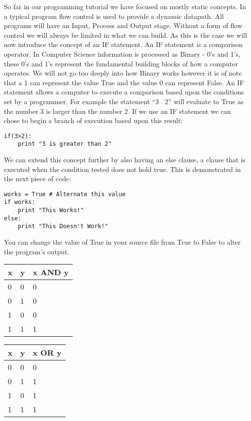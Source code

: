 \documentclass[twocolumn]{article}
\begin{document}
So far in our programming tutorial we have focused on mostly static concepts. In a typical program flow control is used to provide a dynamic datapath. All programs will have an Input, Process and Output stage. Without a form of flow control we will always be limited in what we can build. As this is the case we will now introduce the concept of an IF statement. An IF statement is a comparison operator. In Computer Science information is processed as Binary - 0's and 1's, these 0's and 1's represent the fundamental building blocks of how a computer operates. We will not go too deeply into how Binary works however it is of note that a 1 can represent the value True and the value 0 can represent False. An IF statement allows a computer to execute a comparison based upon the conditions set by a programmer. For example the statement ``3 $\>$ 2'' will evaluate to True as the number 3 is larger than the number 2. If we use an IF statement we can chose to begin a branch of execution based upon this result:
\begin{lstlisting}
if(3>2):
	print "3 is greater than 2"
\end{lstlisting}

We can extend this concept further by also having an else clause, a clause that is executed when the condition tested does not hold true. This is demonstrated in the next piece of code:
\begin{lstlisting}
works = True # Alternate this value
if works:
	print "This Works!"
else:
	print "This Doesn't Work!"
\end{lstlisting}
You can change the value of True in your source file from True to False to alter the program's output.

\begin{center}
	\begin{tabular}{| l | l | l |} 
		\hline
		x & y & x AND y \\ \hline
		0 & 0 & 0 \\
		0 & 1 & 0 \\
		1 & 0 & 0 \\
		1 & 1 & 1 \\
		\hline
	\end{tabular}
\end{center}

\begin{center}
	\begin{tabular}{| l | l | l |} 
		\hline
		x & y & x OR y \\ \hline
		0 & 0 & 0 \\
		0 & 1 & 1 \\
		1 & 0 & 1 \\
		1 & 1 & 1 \\
		\hline
	\end{tabular}
\end{center}
\end{document}
